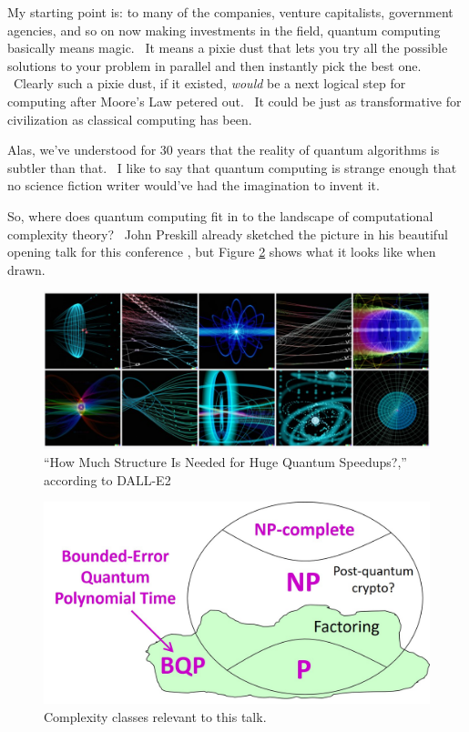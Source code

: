 \documentclass[12pt]{article}
\begin{document}
My starting point is: to many of the companies, venture capitalists, government agencies, and so on now making investments in the field, quantum computing basically means magic. \ It means a pixie dust that lets you try all the possible solutions to your problem in parallel and then instantly pick the best one. \ Clearly such a pixie dust, if it existed, \emph{would} be a next logical step for computing after Moore's Law petered out. \ It could be just as transformative for civilization as classical computing has been.

Alas, we've understood for 30 years that the reality of quantum algorithms is subtler than that. \ I like to say that quantum computing is strange enough that no science fiction writer would've had the imagination to invent it.

So, where does quantum computing fit in to the landscape of computational complexity theory? \ John Preskill already sketched the picture in his beautiful opening talk for this conference \cite{preskill:solvay}, but Figure \ref{classes} shows what it looks like when drawn.

\begin{figure}[p]
\includegraphics[width=5.8in]{dalle.jpg}
\caption{``How Much Structure Is Needed for Huge Quantum Speedups?,'' according to DALL-E2}
\label{dalle}
\end{figure}

\begin{figure}[p]
\includegraphics[width=5.5in]{classes.jpg}
\caption{Complexity classes relevant to this talk.}
\label{classes}
\end{figure}
\end{document}
